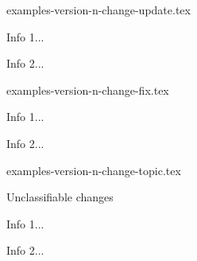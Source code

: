 \begin{filecontents*}[overwrite]{examples-version-n-change-update.tex}
\begin{tdocupdate}
    \item Info 1...
    \item Info 2...
\end{tdocupdate}
\end{filecontents*}


\begin{filecontents*}[overwrite]{examples-version-n-change-fix.tex}
\begin{tdocfix}
    \item Info 1...
    \item Info 2...
\end{tdocfix}
\end{filecontents*}


\begin{filecontents*}[overwrite]{examples-version-n-change-topic.tex}
\begin{tdoctopic}{Unclassifiable changes}
    \item Info 1...
    \item Info 2...
\end{tdoctopic}
\end{filecontents*}



\documentclass[10pt, a4paper]{article}

\usepackage[utf8]{inputenc}
\usepackage[T1]{fontenc}

\usepackage[english]{babel, varioref}

\usepackage{enumitem}

\usepackage{tabularray}
\usepackage{fmtcount}

\setlength{\parindent}{0em}

\usepackage[lang = english]{tutodoc}






